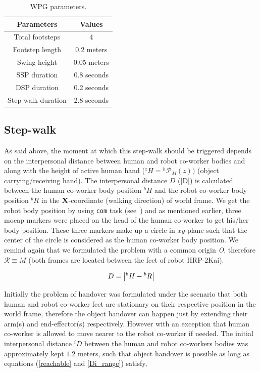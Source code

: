 \begin{table}[hbt]
	\caption{WPG parameters.}
	\label{wpgParam}
	\begin{center}
		\begin{tabular}{|c | c|}
			\hline  
			{\bf Parameters} &  {\bf Values} \\ 
			\hline			
			Total footsteps & 4\\ 
			\hline			
			Footstep length & 0.2 meters\\ 
			\hline
			Swing height & 0.05 meters\\
			\hline			
			SSP duration & 0.8 seconds\\ 
			\hline
			DSP duration & 0.2 seconds\\
			\hline
			Step-walk duration & 2.8 seconds\\			
			\hline 			
		\end{tabular} 
	\end{center}
\end{table}




\subsection{Step-walk}

As said above, the moment at which this step-walk should be triggered depends on the interpersonal distance between human and robot co-worker bodies and along with the height of active human hand ($ {}^{z}H  = {}^{h}\mathcal{P}_M(z)) $ (object carrying/receiving hand). The interpersonal distance $ D $ (\ref{D}) is calculated between the human co-worker body position $ {}^{b}{H} $ and the robot co-worker body position $ {}^{b}{R} $ in the ${\bf X}$-coordinate (walking direction) of world frame. We get the robot body position by using \texttt{com} task (see~) and as mentioned earlier, three mocap markers were placed on the head of the human co-worker to get his/her body position. These three markers make up a circle in $xy$-plane such that the center of the circle is considered as the human co-worker body position. We remind again that we formulated the problem with a common origin {\it O}, therefore $\mathcal R \equiv M$ (both frames are located between the feet of robot HRP-2Kai).

\begin{equation}\label{D}
	D = \abs{{}^{b}{H} - {}^{b}{R}}
\end{equation}

Initially the problem of handover was formulated under the scenario that both human and robot co-worker feet are stationary on their respective position in the world frame, therefore the object handover can happen just by extending their arm(s) and end-effector(s) respectively. However with an exception that human co-worker is allowed to move nearer to the robot co-worker if needed. The initial interpersonal distance $ {}^{i}D $ between the human and robot co-workers bodies was approximately kept $1.2$ meters, such that object handover is possible as long as equations (\ref{reachable} and \ref{Di_range}) satisfy,

